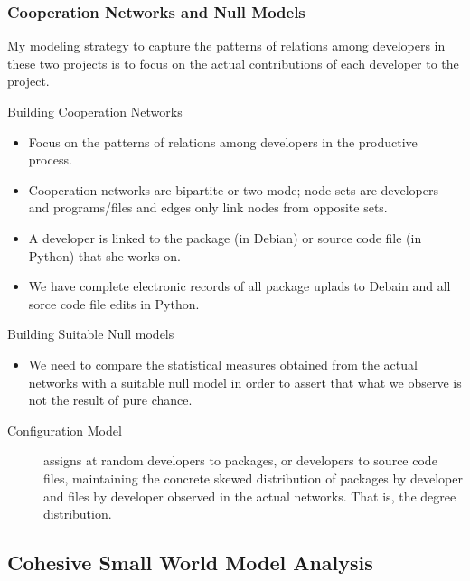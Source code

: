 \documentclass[ignorenonframetext,red,8pt,notes=hide]{beamer}
\begin{document}
\begin{frame}
\frametitle{Cooperation Networks and Null Models}

My modeling strategy to capture the patterns of relations among developers in these two projects is to focus on the actual contributions of each developer to the project. 

\begin{block}{Building Cooperation Networks}
\begin{itemize}
\item Focus on the patterns of relations among developers in the productive process.
\item Cooperation networks are bipartite or two mode; node sets are developers and programs/files and edges only link nodes from opposite sets.
\item A developer is linked to the package (in Debian) or source code file (in Python) that she works on.
\item We have complete electronic records of all package uplads to Debain and all sorce code file edits in Python.
\end{itemize}
\end{block}

\pause

\begin{block}{Building Suitable Null models}
\begin{itemize}
\item We need to compare the statistical measures obtained from the actual networks with a suitable null model in order to assert that what we observe is not the result of pure chance.
\end{itemize}
\begin{description}
\item [Configuration Model] assigns at random developers to packages, or developers to source code files, maintaining the concrete skewed distribution of packages by developer and files by developer observed in the actual networks. That is, the degree distribution.
\end{description}
\end{block}

\end{frame}


\subsection{Cohesive Small World Model Analysis}
\end{document}
